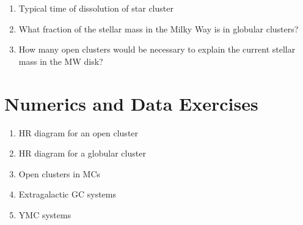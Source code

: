 \begin{enumerate} 
\item Typical time of dissolution of star cluster
\item What fraction of the stellar mass in the Milky Way is in
    globular clusters?
\item How many open clusters would be necessary to explain the current
stellar mass in the MW disk?
\end{enumerate} 

\section{Numerics and Data Exercises}

\begin{enumerate}
\item HR diagram for an open cluster
\item HR diagram for a globular cluster 
\item Open clusters in MCs
\item Extragalactic GC systems
\item YMC systems
\end{enumerate}


  
